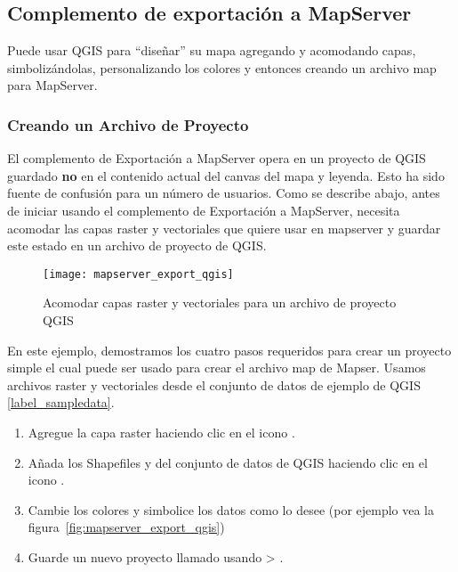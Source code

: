 
\subsection{Complemento de exportación a MapServer}\label{sec:mapserver_export}


Puede usar QGIS para ``diseñar'' su mapa agregando y acomodando capas, 
simbolizándolas, personalizando los colores y entonces creando un archivo map
para MapServer.

\subsubsection{Creando un Archivo de Proyecto}

El complemento de Exportación a MapServer opera en un proyecto de QGIS guardado  
\textbf{no} en el contenido actual del canvas del mapa y leyenda. Esto  
ha sido fuente de confusión para un número de usuarios. Como se describe abajo, 
antes de iniciar usando el complemento de Exportación a MapServer, necesita acomodar 
las capas raster y vectoriales que quiere usar en mapserver y guardar este estado
en un archivo de proyecto de QGIS.

\begin{figure}[ht]
\begin{center}
  \caption{Acomodar capas raster y vectoriales para un archivo de proyecto QGIS \nixcaption}
  \label{fig:mapserver_export_qgs}\smallskip
  \texttt{[image: mapserver\_export\_qgis]}
\end{center}
\end{figure}

En este ejemplo, demostramos los cuatro pasos requeridos para crear un proyecto
simple el cual puede ser usado para crear el archivo map de Mapser. 
Usamos archivos raster y vectoriales desde el conjunto de datos de ejemplo de QGIS \ref{label_sampledata}.

\begin{enumerate}
\item Agregue la capa raster  haciendo clic en el icono 
.
\item Añada los Shapefiles  y 
 del conjunto de datos de QGIS haciendo clic en el icono 
.
\item Cambie los colores y simbolice los datos como lo desee (por ejemplo vea la 
figura~\ref{fig:mapserver_export_qgis})
\item Guarde un nuevo proyecto llamado  usando 
 > .
\end{enumerate} 

